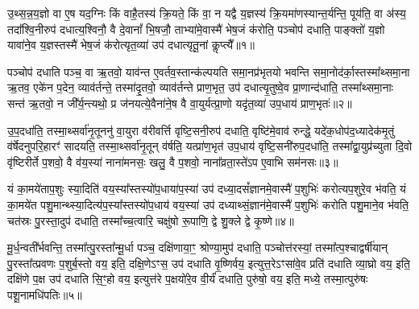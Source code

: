 
{\anuvakamend[{विलि॑ष्टन्त्रि॒ꣳ॒शच्च॑॥12॥}]}

{}

\setcounter{anuvakam}{0}
उ॒थ्स॒न्न॒य॒ज्ञो वा ए॒ष यद॒ग्निः किं वाहै॒तस्य॑ क्रि॒यते॒ किं वा॒ न यद्वै य॒ज्ञस्य॑ क्रि॒यमा॑णस्यान्त॒र्यन्ति॒ पूय॑ति॒ वा अ॑स्य॒ तदा᳚श्वि॒नीरुप॑ दधात्य॒श्विनौ॒ वै दे॒वानां᳚ भि॒षजौ॒ ताभ्या॑मे॒वास्मै॑ भेष॒जं क॑रोति॒ पञ्चोप॑ दधाति॒ पाङ्क्तो॑ य॒ज्ञो यावा॑ने॒व य॒ज्ञस्तस्मै॑ भेष॒जं क॑रोत्यृत॒व्या॑ उप॑ दधात्यृतू॒नां कॢप्त्यै᳚॥१॥

पञ्चोप॑ दधाति पञ्च॒ वा ऋ॒तवो॒ याव॑न्त ए॒वर्तव॒स्तान्क॑ल्पयति समा॒नप्र॑भृतयो भवन्ति समा॒नोद॑र्का॒स्तस्मा᳚थ्समा॒ना ऋ॒तव॒ एके॑न प॒देन॒ व्याव॑र्तन्ते॒ तस्मा॑दृ॒तवो॒ व्याव॑र्तन्ते प्राण॒भृत॒ उप॑ दधात्यृ॒तुष्वे॒व प्रा॒णान्द॑धाति॒ तस्मा᳚थ्समा॒नाः सन्त॑ ऋ॒तवो॒ न जी᳚र्य॒न्त्यथो॒ प्र ज॑नयत्ये॒वैना॑ने॒ष वै वा॒युर्यत्प्रा॒णो यदृ॑त॒व्या॑ उप॒धाय॑ प्राण॒भृतः॑॥२॥

उ॒प॒दधा॑ति॒ तस्मा॒थ्सर्वा॑नृ॒तूननु॑ वा॒युरा व॑रीवर्त्ति वृष्टि॒सनी॒रुप॑ दधाति॒ वृष्टि॑मे॒वाव॑ रुन्द्धे॒ यदे॑क॒धोप॑द॒ध्यादेक॑मृ॒तुं व॑र्\mbox{}षेदनुपरि॒हारꣳ॑ सादयति॒ तस्मा॒थ्सर्वा॑नृ॒तून् व॑र्\mbox{}षति॒ यत्प्रा॑ण॒भृत॑ उप॒धाय॑ वृष्टि॒सनी॑रुप॒दधा॑ति॒ तस्मा᳚द्वा॒युप्र॑च्युता दि॒वो वृ॑ष्टिरीर्ते प॒शवो॒ वै व॑य॒स्या॑ नाना॑मनसः॒ खलु॒ वै प॒शवो॒ नाना᳚व्रता॒स्ते॑\-ऽप ए॒वाभि सम॑नसः॥३॥

यं का॒मये॑ताप॒शुः स्या॒दिति॑ वय॒स्या᳚स्तस्यो॑प॒धाया॑प॒स्या॑ उप॑ दध्या॒दसं᳚ज्ञानमे॒वास्मै॑ प॒शुभिः॑ करोत्यप॒शुरे॒व भ॑वति॒ यं का॒मये॑त पशु॒मान्थ्स्या॒दित्य॑प॒स्या᳚स्तस्यो॑प॒धाय॑ वय॒स्या॑ उप॑ दध्याथ्सं॒ज्ञान॑मे॒वास्मै॑ प॒शुभिः॑ करोति पशु॒माने॒व भ॑वति॒ चत॑स्रः पु॒रस्ता॒दुप॑ दधाति॒ तस्मा᳚च्च॒त्वारि॒ चक्षु॑षो रू॒पाणि॒ द्वे शु॒क्ले द्वे कृ॒ष्णे॥४॥

मू॒र्ध॒न्वती᳚र्भवन्ति॒ तस्मा᳚त्पु॒रस्ता᳚न्मू॒र्धा पञ्च॒ दक्षि॑णाया॒ꣳ॒ श्रोण्या॒मुप॑ दधाति॒ पञ्चोत्त॑रस्यां॒ तस्मा᳚त्प॒श्चाद्वर्\mbox{}षी॑यान् पु॒रस्ता᳚त्प्रवणः प॒शुर्ब॒स्तो वय॒ इति॒ दक्षि॒णे\-ऽꣳस॒ उप॑ दधाति वृ॒ष्णिर्वय॒ इत्युत्त॒रे\-ऽꣳसा॑वे॒व प्रति॑ दधाति व्या॒घ्रो वय॒ इति॒ दक्षि॑णे प॒क्ष उप॑ दधाति सि॒ꣳ॒हो वय॒ इत्युत्त॑रे प॒क्षयो॑रे॒व वी॒र्यं॑ दधाति॒ पुरु॑षो॒ वय॒ इति॒ मध्ये॒ तस्मा॒त्पुरु॑षः पशू॒नामधि॑पतिः॥५॥

